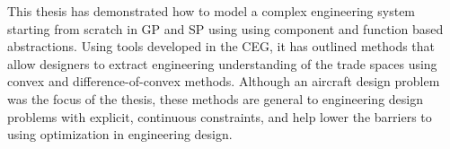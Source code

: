 This thesis has demonstrated how to model a complex engineering system
starting from scratch in \gls{GP} and \gls{SP} using
using component and function based abstractions. Using tools developed in the \gls{CEG},
it has outlined methods that allow designers to extract engineering understanding of
the trade spaces using convex and difference-of-convex methods.
Although an aircraft design problem was the focus of the thesis,
these methods are general to engineering design problems with explicit, continuous constraints,
and help lower the barriers to using optimization in engineering design.

